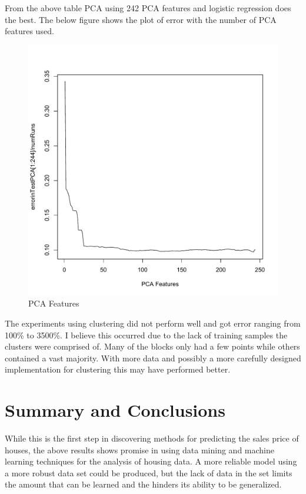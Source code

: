 \documentclass[fleqn,10pt]{SelfArx} %
\begin{document}
From the above table PCA using 242 PCA features and logistic regression does the best. The below figure shows the plot of error with the number of PCA features used.

\begin{figure}[h]
  \centering
      \includegraphics[scale=0.4]{PCA}
\caption{PCA Features}
\label{fig:cost}
\end{figure}


The experiments using clustering did not perform well and got error ranging from 100\% to 3500\%. I believe this occurred due to the lack of training samples
the clusters were comprised of. Many of the blocks only had a few points while others contained a vast majority. With more data and possibly a more carefully designed
implementation for clustering this may have performed better.




\section{Summary and Conclusions}

While this is the first step in discovering methods for predicting the sales price of houses, the above results shows promise in using data mining and machine learning techniques
for the analysis of housing data. A more reliable model using a more robust data set could be produced, but the lack of data in the set limits the amount that can be learned and
the hinders its ability to be generalized. 
\end{document}
